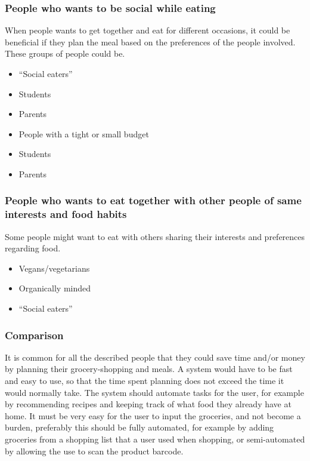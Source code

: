 \subsubsection{People who wants to be social while eating}
When people wants to get together and eat for different occasions, it could be beneficial if they plan the meal based on the preferences of the people involved.
These groups of people could be.
\begin{itemize}
\item “Social eaters”
\item Students
\item Parents
\item People with a tight or small budget
\item Students
\item Parents
\end{itemize}

\subsubsection{People who wants to eat together with other people of same interests and food habits}
Some people might want to eat with others sharing their interests and preferences regarding food.
\begin{itemize}
\item Vegans/vegetarians
\item Organically minded
\item “Social eaters”
\end{itemize}

\subsubsection{Comparison}
It is common for all the described people that they could save time and/or money by planning their grocery-shopping and meals. A system would have to be fast and easy to use, so that the time spent planning does not exceed the time it would normally take. The system should automate tasks for the user, for example by recommending recipes and keeping track of what food they already have at home. It must be very easy for the user to input the groceries, and not become a burden, preferably this should be fully automated, for example by adding groceries from a shopping list that a user used when shopping, or semi-automated by allowing the use to scan the product barcode.

